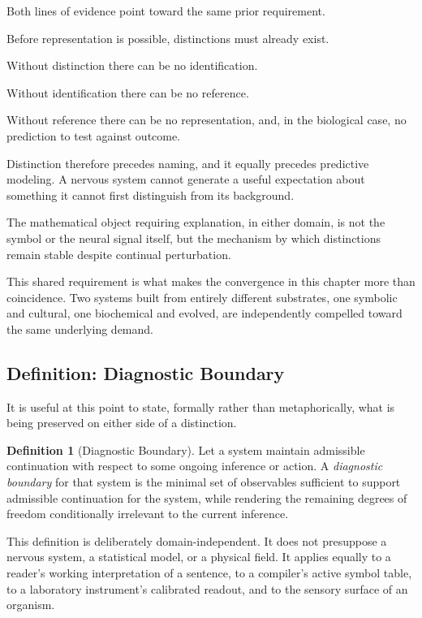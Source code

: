 \documentclass[11pt,oneside]{book}
\numberwithin{equation}{chapter}
\theoremstyle{definition}
\newtheorem{definition}{Definition}[chapter]
\theoremstyle{plain}
\begin{document}
Both lines of evidence point toward the same prior requirement.

Before representation is possible, distinctions must already exist.

Without distinction there can be no identification.

Without identification there can be no reference.

Without reference there can be no representation, and, in the biological
case, no prediction to test against outcome.

Distinction therefore precedes naming, and it equally precedes predictive
modeling. A nervous system cannot generate a useful expectation about
something it cannot first distinguish from its background.

The mathematical object requiring explanation, in either domain, is not the
symbol or the neural signal itself, but the mechanism by which distinctions
remain stable despite continual perturbation.

This shared requirement is what makes the convergence in this chapter more
than coincidence. Two systems built from entirely different substrates, one
symbolic and cultural, one biochemical and evolved, are independently
compelled toward the same underlying demand.

\subsection*{Definition: Diagnostic Boundary}

It is useful at this point to state, formally rather than metaphorically,
what is being preserved on either side of a distinction.

\begin{definition}[Diagnostic Boundary]
Let a system maintain admissible continuation with respect to some ongoing
inference or action. A \emph{diagnostic boundary} for that system is the
minimal set of observables sufficient to support admissible continuation for
the system, while rendering the remaining degrees of freedom conditionally
irrelevant to the current inference.
\end{definition}

This definition is deliberately domain-independent. It does not presuppose a
nervous system, a statistical model, or a physical field. It applies equally
to a reader's working interpretation of a sentence, to a compiler's active
symbol table, to a laboratory instrument's calibrated readout, and to the
sensory surface of an organism.
\end{document}
